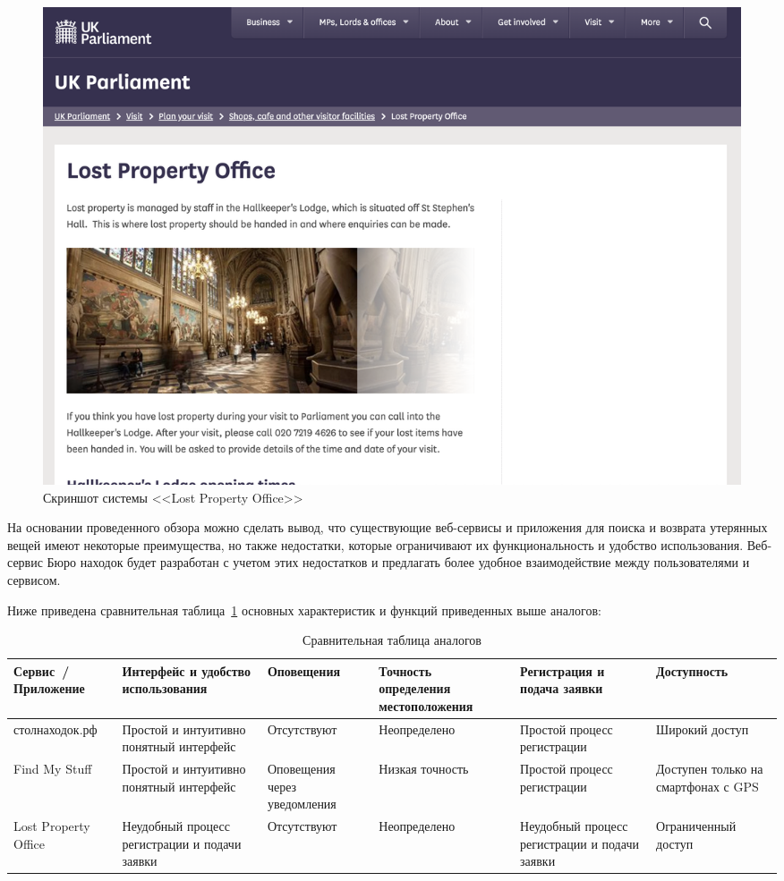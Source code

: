 \begin{figure}[htb]
	\centering
	\includegraphics[width=.95\textwidth]{images/lostPropertyOffice}
	\parskip=6pt
	\caption{Скриншот системы <<Lost Property Office>>}
	\label{fig:lostPropertyOffice}
\end{figure}

На основании проведенного обзора можно сделать вывод, что существующие веб-сервисы и приложения для поиска и возврата утерянных вещей имеют некоторые преимущества, но также недостатки, которые ограничивают их функциональность и удобство использования. Веб-сервис Бюро находок будет разработан с учетом этих недостатков и предлагать более удобное взаимодействие между пользователями и сервисом.

Ниже приведена сравнительная таблица~\ref{tab:analogs_comparison} основных характеристик и функций приведенных выше аналогов:
\begin{table}[htb]
	\caption{Сравнительная таблица аналогов}
	\centering
	
	\emergencystretch=10pt
	\small
	\begin{tabular}{ |p{2cm}|p{3cm}|p{2cm}|p{2cm}|p{3cm}|p{2cm}| } 
		\hline
		Сервис~/ Приложение & Интерфейс и удобство использования & Опове\-ще\-ния & Точность определения местоположения & Регистрация и подача заявки & Доступ\-ность \\ \hline
		
		стол\-на\-ходок.рф & Простой и интуитивно понятный интерфейс & Отсут\-ству\-ют & Не\-оп\-ре\-де\-ле\-но & Простой процесс регистрации & Широкий доступ \\ \hline
		
		Find My Stuff & Простой и интуитивно понятный интерфейс & Опо\-ве\-ще\-ния через уведомления & Низкая точность & Простой процесс регистрации & Доступен только на смартфонах с GPS \\ \hline
		
		Lost Property Office & Неудобный процесс регистрации и подачи заявки & Отсут\-ству\-ют & Не\-оп\-ре\-де\-ле\-но & Неудобный процесс регистрации и подачи заявки & Огра\-ни\-чен\-ный доступ \\ \hline
	\end{tabular}
	\label{tab:analogs_comparison}
\end{table}

